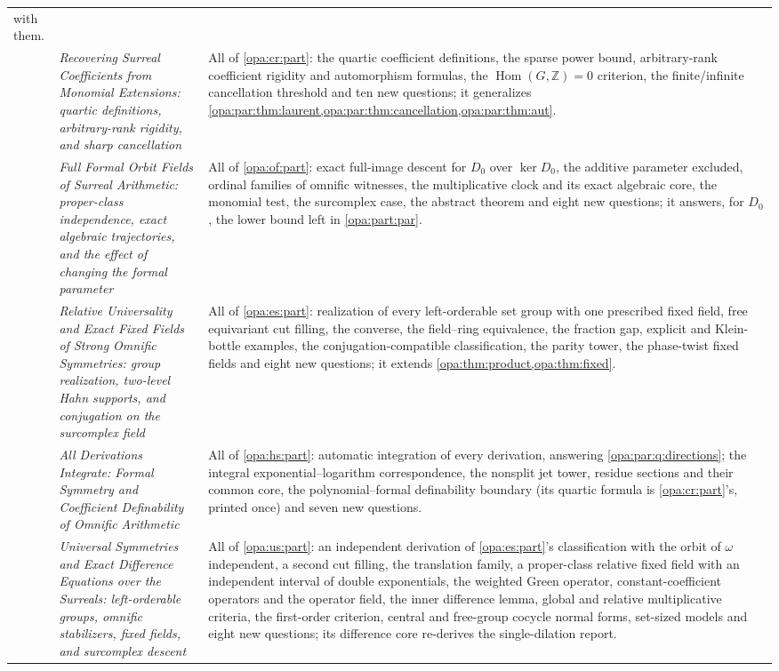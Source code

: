 \documentclass[11pt,oneside]{article}
\numberwithin{equation}{section}
\theoremstyle{definition}
\theoremstyle{remark}
\newcommand{\Z}{\mathbb Z}
\newcommand{\Hom}{\operatorname{Hom}}
\begin{document}
\begin{center}
\begin{longtable}{>{\raggedright\arraybackslash}p{}>{\raggedright\arraybackslash}p{}>{\raggedright\arraybackslash}p{}}
with them.\\
16 & \emph{Recovering Surreal Coefficients from Monomial Extensions: quartic
definitions, arbitrary-rank rigidity, and sharp cancellation} &
All of \cref{opa:cr:part}: the quartic coefficient definitions, the sparse power
bound, arbitrary-rank coefficient rigidity and automorphism formulas, the
$\Hom(G,\Z)=0$ criterion, the finite/infinite cancellation threshold and ten new
questions; it generalizes \cref{opa:par:thm:laurent,opa:par:thm:cancellation,opa:par:thm:aut}.\\
17 & \emph{Full Formal Orbit Fields of Surreal Arithmetic: proper-class independence,
exact algebraic trajectories, and the effect of changing the formal parameter} &
All of \cref{opa:of:part}: exact full-image descent for $D_0$ over $\ker D_0$, the
additive parameter excluded, ordinal families of omnific witnesses, the multiplicative
clock and its exact algebraic core, the monomial test, the surcomplex case, the abstract
theorem and eight new questions; it answers, for $D_0$, the lower bound left in
\cref{opa:part:par}.\\
18 & \emph{Relative Universality and Exact Fixed Fields of Strong Omnific Symmetries:
group realization, two-level Hahn supports, and conjugation on the surcomplex field} &
All of \cref{opa:es:part}: realization of every left-orderable set group with one
prescribed fixed field, free equivariant cut filling, the converse, the field--ring
equivalence, the fraction gap, explicit and Klein-bottle examples, the
conjugation-compatible classification, the parity tower, the phase-twist fixed fields
and eight new questions; it extends \cref{opa:thm:product,opa:thm:fixed}.\\
19 & \emph{All Derivations Integrate: Formal Symmetry and Coefficient Definability of
Omnific Arithmetic} & All of \cref{opa:hs:part}: automatic integration of every
derivation, answering \cref{opa:par:q:directions}; the integral exponential--logarithm
correspondence, the nonsplit jet tower, residue sections and their common core, the
polynomial--formal definability boundary (its quartic formula is \cref{opa:cr:part}'s,
printed once) and seven new questions.\\
20 & \emph{Universal Symmetries and Exact Difference Equations over the Surreals:
left-orderable groups, omnific stabilizers, fixed fields, and surcomplex descent} & All of
\cref{opa:us:part}: an independent derivation of \cref{opa:es:part}'s classification with the
orbit of $\omega$ independent, a second cut filling, the translation family, a proper-class
relative fixed field with an independent interval of double exponentials, the weighted Green
operator, constant-coefficient operators and the operator field, the inner difference lemma,
global and relative multiplicative criteria, the first-order criterion, central and free-group
cocycle normal forms, set-sized models and eight new questions; its difference core
re-derives the single-dilation report.\\
\bottomrule
\end{longtable}
\end{center}
\end{document}
